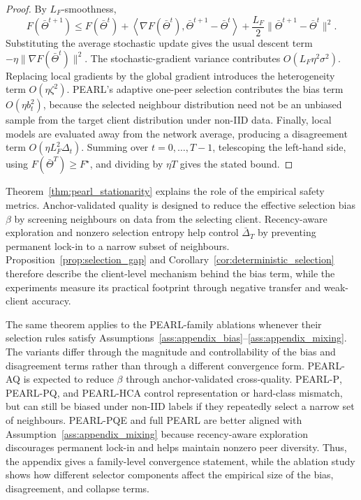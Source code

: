 \documentclass[conference]{IEEEtran}
\begin{document}
\begin{proof}
By \(L_F\)-smoothness,
\begin{equation*}
F(\bar{\Theta}^{t+1})
\leq
F(\bar{\Theta}^{t})
+
\left\langle
\nabla F(\bar{\Theta}^{t}),
\bar{\Theta}^{t+1}-\bar{\Theta}^{t}
\right\rangle
+
\frac{L_F}{2}
\|\bar{\Theta}^{t+1}-\bar{\Theta}^{t}\|^2 .
\end{equation*}
Substituting the average stochastic update gives the usual descent term
\(-\eta\|\nabla F(\bar{\Theta}^{t})\|^2\). The stochastic-gradient variance contributes \(O(L_F\eta^2\sigma^2)\). Replacing local gradients by the global gradient introduces the heterogeneity term \(O(\eta\zeta^2)\). PEARL's adaptive one-peer selection contributes the bias term \(O(\eta b_t^2)\), because the selected neighbour distribution need not be an unbiased sample from the target client distribution under non-IID data. Finally, local models are evaluated away from the network average, producing a disagreement term \(O(\eta L_F^2\Delta_t)\). Summing over \(t=0,\ldots,T-1\), telescoping the left-hand side, using \(F(\bar{\Theta}^{T})\geq F^\star\), and dividing by \(\eta T\) gives the stated bound.
\end{proof}

Theorem~\ref{thm:pearl_stationarity} explains the role of the empirical safety metrics. Anchor-validated quality is designed to reduce the effective selection bias \(\beta\) by screening neighbours on data from the selecting client. Recency-aware exploration and nonzero selection entropy help control \(\bar{\Delta}_T\) by preventing permanent lock-in to a narrow subset of neighbours. Proposition~\ref{prop:selection_gap} and Corollary~\ref{cor:deterministic_selection} therefore describe the client-level mechanism behind the bias term, while the experiments measure its practical footprint through negative transfer and weak-client accuracy.

The same theorem applies to the PEARL-family ablations whenever their selection rules satisfy Assumptions~\ref{ass:appendix_bias}--\ref{ass:appendix_mixing}. The variants differ through the magnitude and controllability of the bias and disagreement terms rather than through a different convergence form. \textsc{PEARL-AQ} is expected to reduce \(\beta\) through anchor-validated cross-quality. \textsc{PEARL-P}, \textsc{PEARL-PQ}, and \textsc{PEARL-HCA} control representation or hard-class mismatch, but can still be biased under non-IID labels if they repeatedly select a narrow set of neighbours. \textsc{PEARL-PQE} and full \textsc{PEARL} are better aligned with Assumption~\ref{ass:appendix_mixing} because recency-aware exploration discourages permanent lock-in and helps maintain nonzero peer diversity. Thus, the appendix gives a family-level convergence statement, while the ablation study shows how different selector components affect the empirical size of the bias, disagreement, and collapse terms.
\end{document}
